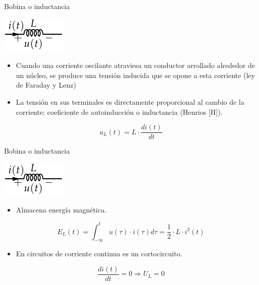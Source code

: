\documentclass[aspectratio=169, usenames,svgnames,dvipsnames]{beamer}
\begin{document}
\begin{frame}[label={sec:org9dba6db}]{Bobina o inductancia}
\begin{center}
\includegraphics[height=0.2\textheight]{../figs/Bobina.pdf}
\end{center}

\begin{itemize}
\item Cuando una corriente oscilante atraviesa un conductor arrollado alrededor de un núcleo, se produce una \alert{tensión inducida que se opone a esta corriente} (ley de Faraday y Lenz)

\item La tensión en sus terminales es directamente proporcional al cambio de la corriente: coeficiente de autoinducción o \alert{inductancia} (Henrios [H]).
\end{itemize}

\[
u_L(t)=L\cdot\frac{di(t)}{dt}
\]
\end{frame}
\begin{frame}[label={sec:orgf0ded08}]{Bobina o inductancia}
\begin{center}
\includegraphics[height=0.2\textheight]{../figs/Bobina.pdf}
\end{center}

\begin{itemize}
\item Almacena \alert{energía magnética}.
\end{itemize}

\[
  E_L(t) = \int_{-\infty}^t u(\tau) \cdot i(\tau) d\tau = \frac{1}{2} \cdot L \cdot i^2(t)
\]
\begin{itemize}
\item En circuitos de corriente continua es un cortocircuito.
\end{itemize}

\begin{equation*}
  \frac{di(t)}{dt} = 0 \Rightarrow U_L = 0
\end{equation*}
\end{frame}
\end{document}
